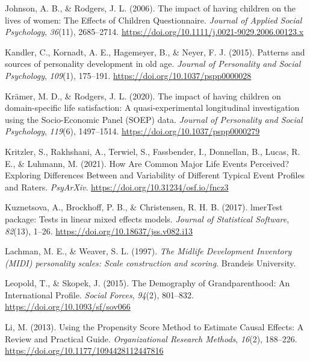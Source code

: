 \documentclass[
  english,
  man,floatsintext]{apa7}
\begin{document}
\leavevmode\hypertarget{ref-johnsonImpactHavingChildren2006}{}%
Johnson, A. B., \& Rodgers, J. L. (2006). The impact of having children on the lives of women: The Effects of Children Questionnaire. \emph{Journal of Applied Social Psychology}, \emph{36}(11), 2685--2714. \url{https://doi.org/10.1111/j.0021-9029.2006.00123.x}

\leavevmode\hypertarget{ref-kandlerPatternsSourcesPersonality2015a}{}%
Kandler, C., Kornadt, A. E., Hagemeyer, B., \& Neyer, F. J. (2015). Patterns and sources of personality development in old age. \emph{Journal of Personality and Social Psychology}, \emph{109}(1), 175--191. \url{https://doi.org/10.1037/pspp0000028}

\leavevmode\hypertarget{ref-kramerImpactHavingChildren2020}{}%
Krämer, M. D., \& Rodgers, J. L. (2020). The impact of having children on domain-specific life satisfaction: A quasi-experimental longitudinal investigation using the Socio-Economic Panel (SOEP) data. \emph{Journal of Personality and Social Psychology}, \emph{119}(6), 1497--1514. \url{https://doi.org/10.1037/pspp0000279}

\leavevmode\hypertarget{ref-kritzlerHowAreCommon2021}{}%
Kritzler, S., Rakhshani, A., Terwiel, S., Fassbender, I., Donnellan, B., Lucas, R. E., \& Luhmann, M. (2021). How Are Common Major Life Events Perceived? Exploring Differences Between and Variability of Different Typical Event Profiles and Raters. \emph{PsyArXiv}. \url{https://doi.org/10.31234/osf.io/fncz3}

\leavevmode\hypertarget{ref-R-lmerTest}{}%
Kuznetsova, A., Brockhoff, P. B., \& Christensen, R. H. B. (2017). lmerTest package: Tests in linear mixed effects models. \emph{Journal of Statistical Software}, \emph{82}(13), 1--26. \url{https://doi.org/10.18637/jss.v082.i13}

\leavevmode\hypertarget{ref-lachmanMidlifeDevelopmentInventory1997}{}%
Lachman, M. E., \& Weaver, S. L. (1997). \emph{The Midlife Development Inventory (MIDI) personality scales: Scale construction and scoring}. Brandeis University.

\leavevmode\hypertarget{ref-leopoldDemographyGrandparenthoodInternational2015}{}%
Leopold, T., \& Skopek, J. (2015). The Demography of Grandparenthood: An International Profile. \emph{Social Forces}, \emph{94}(2), 801--832. \url{https://doi.org/10.1093/sf/sov066}

\leavevmode\hypertarget{ref-liUsingPropensityScore2013}{}%
Li, M. (2013). Using the Propensity Score Method to Estimate Causal Effects: A Review and Practical Guide. \emph{Organizational Research Methods}, \emph{16}(2), 188--226. \url{https://doi.org/10.1177/1094428112447816}
\end{document}
